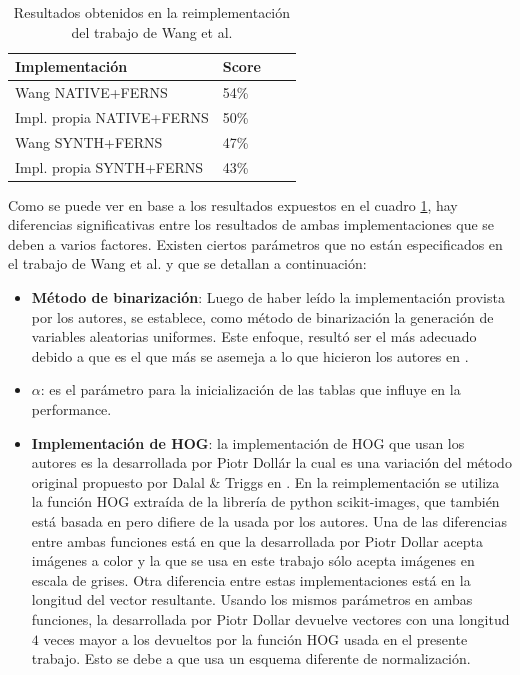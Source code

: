 	\begin{table}
		\centering
	    \begin{tabular}{ | l | l | l | p{5cm} |}
    			\hline
    				\textbf{Implementación} & \textbf{Score} \\ \hline
    				Wang NATIVE+FERNS & 54\% \\ \hline
    				Impl. propia NATIVE+FERNS & 50\% \\ \hline
    				Wang SYNTH+FERNS & 47\% \\ \hline
    				Impl. propia SYNTH+FERNS & 43\% \\

    			\hline
    		\end{tabular}
    		\caption[Resultados reales y sintéticas para baseline]{Resultados obtenidos en la reimplementación del trabajo de Wang et al.}
    		\label{table: Baseline-Table}
	\end{table}

	Como se puede ver en base a los resultados expuestos en el cuadro \ref{table: Baseline-Table}, hay diferencias significativas entre los resultados de ambas implementaciones que se deben a varios factores. Existen ciertos parámetros que no están especificados en el trabajo de Wang et al. y que se detallan a continuación:
	
	\begin{itemize}
		\item \textbf{Método de binarización}: Luego de haber leído la implementación provista por los autores, se establece, como método de binarización la generación de variables aleatorias uniformes. Este enfoque, resultó ser el más adecuado debido a que es el que más se asemeja a lo que hicieron los autores en \cite{wang}.
		\item \textbf{$\alpha$}: es el parámetro para la inicialización de las tablas que influye en la performance.
		\item \textbf{Implementación de HOG}: la implementación de HOG que usan los autores es la desarrollada por Piotr Dollár \cite{PiotrD} la cual es una variación del método original propuesto por Dalal \& Triggs en \cite{DT05}. En la reimplementación se utiliza la función HOG extraída de la librería de python scikit-images, que también está basada en \cite{DT05} pero difiere de la usada por los autores. Una de las diferencias entre ambas funciones está en que la desarrollada por Piotr Dollar acepta imágenes a color y la que se usa en este trabajo sólo acepta imágenes en escala de grises. Otra diferencia entre estas implementaciones está en la longitud del vector resultante. Usando los mismos parámetros en ambas funciones, la desarrollada por Piotr Dollar devuelve vectores con una longitud $4$ veces mayor a los devueltos por la función HOG usada en el presente trabajo. Esto se debe a que usa un esquema diferente de normalización.
	\end{itemize}
	
